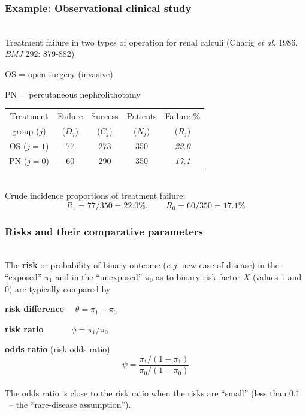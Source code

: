 \documentclass[handout,12pt]{beamer}
\begin{document}
\begin{frame}[fragile] \frametitle{Example: Observational clinical study}
\ \\
Treatment failure in two types of operation for renal calculi 
(Charig \textit{et al.} 1986. \textit{BMJ} 292: 879-882)
\bi
\item 
OS = open surgery (invasive)
\item 
 PN = percutaneous nephrolithotomy 
\ei
\begin{center}
\begin{tabular}{ccccc}
\toprule
Treatment & Failure  &  Success   &   Patients  & Failure-\% \\
group ($j$) &  ($D_{j}$) &  ($C_{j}$) &  ($N_{j}$) &  ($R_{j}$)\\
\midrule
   OS ($j=1$)    & 77     & 273   & 350        & {\em 22.0}   \\
   PN ($j=0$)    & 60     & 290   & 350        & {\em 17.1} \\
\bottomrule
\end{tabular}
\end{center}
\ \\
Crude incidence proportions of treatment failure: $$R_1 = 77/350 = 22.0\%,\qquad R_0 = 60/350 = 17.1\%$$ 
\end{frame} 
\begin{frame}[fragile] \frametitle{Risks and their comparative parameters}
\ \\
The {\bf risk} or {probability} of binary outcome ({\it e.g.} new case of disease) in the ``exposed'' $\pi_1$ and in the ``unexposed'' $\pi_0$ as to binary risk factor $X$ (values 1 and 0) are typically compared by
\bi
\item {\bf risk difference} $\quad \theta = \pi_1 - \pi_0$
\item {\bf risk ratio} $\quad	\quad \quad \phi = \pi_1/\pi_0$
\item {\bf odds ratio} (risk odds ratio)
$$\psi = \frac{\pi_1/(1 - \pi_1)}{\pi_0/(1 - \pi_0)}$$
\ei
\ \\
The odds ratio is close to the risk ratio when the risks are ``small'' (less than $0.1$\ -- the ``rare-disease assumption'').
\end{frame}
\end{document}

